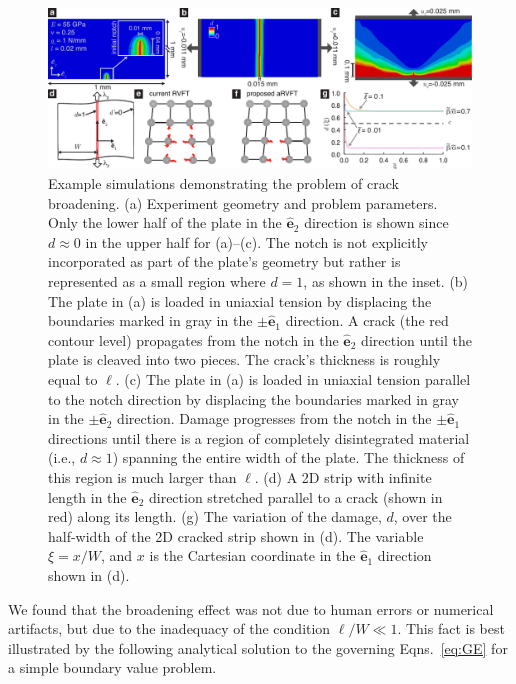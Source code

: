 \documentclass[10pt,letterpaper]{article}
\begin{document}
    \begin{figure}[t!]
      \centering
        \includegraphics[width=\textwidth]{Figures/Broadening/Broadening_V9.pdf}
          \caption{ \footnotesize Example simulations demonstrating the problem of crack broadening. (a) Experiment geometry and problem parameters. Only the lower half of the plate in the $\hat{\mathbf{e}}_2$ direction is shown since $d\approx 0$ in the upper half for (a)--(c). The notch is not explicitly incorporated as part of the plate's geometry but rather is represented as a small region where $d=1$, as shown in the inset. (b) The plate in (a) is loaded in uniaxial tension by displacing the boundaries marked in gray in the $\pm \hat{\mathbf{e}}_1$ direction. A crack (the red contour level) propagates from the notch in the $\hat{\mathbf{e}}_2$ direction until the plate is cleaved into two pieces. The crack's thickness is roughly equal to $\ell$. (c) The plate in (a) is loaded in uniaxial tension parallel to the notch direction by displacing the boundaries marked in gray in the $\pm \hat{\mathbf{e}}_2$ direction. Damage progresses from the notch in the $\pm \hat{\mathbf{e}}_1$ directions until there is a region of completely disintegrated material (i.e., $d\approx1$) spanning the entire width of the plate. The thickness of this region is much larger than $\ell$. (d) A 2D strip with infinite length in the $\hat{\mathbf{e}}_2$ direction stretched parallel to a crack (shown in red) along its length. (g) The variation of the damage, $d$, over the half-width of the 2D cracked strip shown in (d). The variable $\xi=x/W$, and $x$ is the Cartesian coordinate in the  $\hat{\mathbf{e}}_1$ direction shown in (d).
      }
      \label{f:broadening}
    \end{figure}

    We found that the broadening effect was not due to human errors or numerical artifacts, but due to the inadequacy of the condition $\ell/W \ll 1$.
    This  fact is best illustrated by the following analytical solution to the governing Eqns.~\eqref{eq:GE} for a simple boundary value problem.
\end{document}
